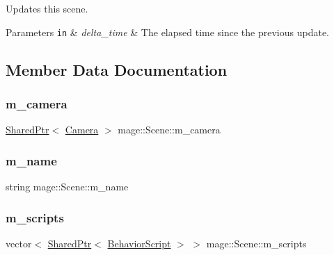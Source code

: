 Updates this scene.


\begin{DoxyParams}[1]{Parameters}
\mbox{\tt in}  & {\em delta\+\_\+time} & The elapsed time since the previous update. \\
\hline
\end{DoxyParams}


\subsection{Member Data Documentation}
\hypertarget{classmage_1_1_scene_a961c280659f9934441d8e835508e933d}{}\label{classmage_1_1_scene_a961c280659f9934441d8e835508e933d} 
\subsubsection{\texorpdfstring{m\+\_\+camera}{m\_camera}}
{\footnotesize\ttfamily \hyperlink{namespacemage_a1e01ae66713838a7a67d30e44c67703e}{Shared\+Ptr}$<$ \hyperlink{classmage_1_1_camera}{Camera} $>$ mage\+::\+Scene\+::m\+\_\+camera\hspace{0.3cm}{\ttfamily [private]}}

\hypertarget{classmage_1_1_scene_a6cc8cb08b1853c4e3063b33a94e8fb47}{}\label{classmage_1_1_scene_a6cc8cb08b1853c4e3063b33a94e8fb47} 
\subsubsection{\texorpdfstring{m\+\_\+name}{m\_name}}
{\footnotesize\ttfamily string mage\+::\+Scene\+::m\+\_\+name\hspace{0.3cm}{\ttfamily [private]}}

\hypertarget{classmage_1_1_scene_a84548bf6978f8955ce5892cb23536a4e}{}\label{classmage_1_1_scene_a84548bf6978f8955ce5892cb23536a4e} 
\subsubsection{\texorpdfstring{m\+\_\+scripts}{m\_scripts}}
{\footnotesize\ttfamily vector$<$ \hyperlink{namespacemage_a1e01ae66713838a7a67d30e44c67703e}{Shared\+Ptr}$<$ \hyperlink{classmage_1_1_behavior_script}{Behavior\+Script} $>$ $>$ mage\+::\+Scene\+::m\+\_\+scripts\hspace{0.3cm}{\ttfamily [private]}}

